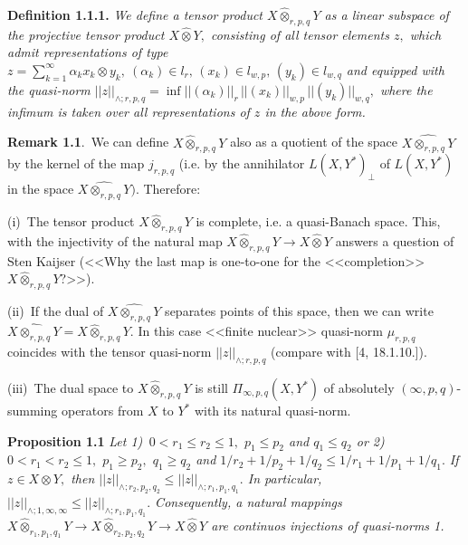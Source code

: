  \textbf{Definition 1.1.1.}  {\it
 We define a tensor product $X\widehat\otimes_{r,p,q} Y$ as a linear subspace of
 the projective tensor product $X\widehat\otimes Y,$ consisting of all tensor elements $z,$
 which admit representations of type
 $
  z=\sum_{k=1}^\infty \alpha_k x_k\otimes y_k,\
  (\alpha_k)\in l_r,\, (x_k)\in l_{w,p},\, (y_k)\in l_{w,q}
 $
 and equipped with the quasi-norm $||z||_{\land\!; r,p,q}= \inf ||(\alpha_k)||_r\,
  ||(x_k)||_{w,p}\, ||(y_k)||_{w,q},$ where the infimum is taken over all
  representations of $z$ in the above form.
  }
       \smallskip

 \textbf{Remark 1.1}.\,
  We can define $X\widehat\otimes_{r,p,q} Y$ also as a quotient of the space $\widehat{X\otimes_{r,p,q} Y}$
 by the kernel of the map $j_{r,p,q}$ (i.e. by the annihilator $L(X,Y^*)_{\perp}$ of
$L(X,Y^*)$ in the space $\widehat{X\otimes_{r,p,q} Y}).$ Therefore:

 (i)\,
 The tensor product $X\widehat\otimes_{r,p,q} Y$ is complete, i.e. a quasi-Banach space.
This, with the injectivity of the natural map $X\widehat\otimes_{r,p,q} Y\to X\widehat\otimes Y$
answers a  question of Sten Kaijser (<<Why the last map is one-to-one
for the <<completion>> $X\widehat\otimes_{r,p,q} Y$?>>).

 (ii)\,
If the dual of $\widehat{X\otimes_{r,p,q} Y}$ separates points of this space,
 then we can write $\widehat{X\otimes_{r,p,q} Y}= X\widehat\otimes_{r,p,q} Y.$ In this case
 <<finite nuclear>> quasi-norm $\mu_{r,p,q}$ coincides with the tensor quasi-norm
$||z||_{\land\!; r,p,q}$ (compare with [4, 18.1.10.]).

(iii)\,
 The dual space to $X\widehat\otimes_{r,p,q} Y$ is still
 $\Pi_{\infty,p,q}(X,Y^*)$ of absolutely $(\infty,p,q)$-summing operators
from $X$ to $Y^*$ with its natural quasi-norm.
                        \smallskip


\textbf{Proposition 1.1} {\it
Let
1)\,
$0<r_1\leqslant r_2\leqslant1,$ $p_1\leqslant p_2$ and $q_1\leqslant q_2$
or
2)\,
 $0<r_1< r_2\leqslant1,$ $p_1\geqslant p_2,$ $q_1\geqslant q_2$ and
 $1/r_2+1/p_2+1/q_2\leqslant 1/r_1+1/p_1+1/q_1.$
If $z\in X\otimes Y,$ then
 $||z||_{\land\!; r_2,p_2,q_2} \leqslant ||z||_{\land\!; r_1,p_1,q_1}.$
In particular,
$||z||_{\land\!; 1,\infty,\infty} \leqslant ||z||_{\land\!; r_1,p_1,q_1}.$
Consequen\-t\-ly, a natural mappings
$X\widehat\otimes_{r_1,p_1,q_1} Y\to X\widehat\otimes_{r_2,p_2,q_2} Y\to X\widehat\otimes Y$ are continuos
injections of quasi-norms 1.
}
                       \smallskip


